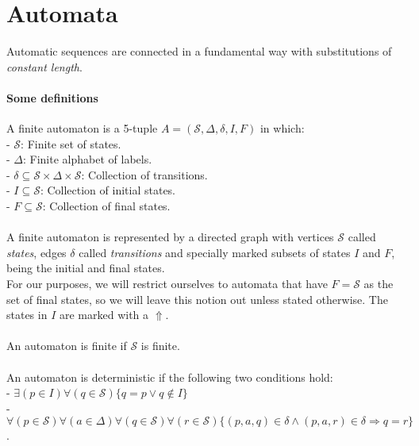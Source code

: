 \documentclass{article}
\begin{document}
\newcommand{\qed}{$\blacksquare$}
\newcommand{\bs}{\begin{small}}
\newcommand{\es}{\end{small}}
\newcommand{\bS}{\begin{tiny}}
\newcommand{\eS}{\end{tiny}}

\section*{Automata}
Automatic sequences are connected in a fundamental way with substitutions of
\emph{constant length}.

\paragraph{Some definitions}
A finite automaton is a 5-tuple $A = (\mathcal{S}, \Delta, \delta, I, F)$
in which:\\
- $\mathcal{S}$: Finite set of states.\\
- $\Delta$: Finite alphabet of labels.\\
- $\delta \subseteq \mathcal{S} \times \Delta \times \mathcal{S}$:
Collection of transitions.\\
- $I \subseteq \mathcal{S}$: Collection of initial states.\\
- $F \subseteq \mathcal{S}$: Collection of final states.\\
\\
A finite automaton is represented by a directed graph with vertices
$\mathcal{S}$ called \emph{states}, edges $\delta$ called \emph{transitions}
and specially marked subsets of states $I$ and $F$, being the initial and final
states.\\
For our purposes, we will restrict ourselves to automata that have
$F = \mathcal{S}$ as the set of final states, so we will leave this notion
out unless stated otherwise. The states in $I$ are marked with a $\Uparrow$.\\
\\
An automaton is finite if $\mathcal{S}$ is finite.\\
\\
An automaton is deterministic if the following two conditions hold:\\
- $\exists (p \in I) \forall (q  \in \mathcal{S})
\{q = p \lor q \notin I\}$\\
- $\forall (p \in \mathcal{S}) \forall (a \in \Delta)
\forall (q \in \mathcal{S}) \forall (r \in \mathcal{S})
\{(p, a, q) \in \delta \land (p, a, r) \in \delta \Rightarrow q = r\}$.\\
\end{document}
